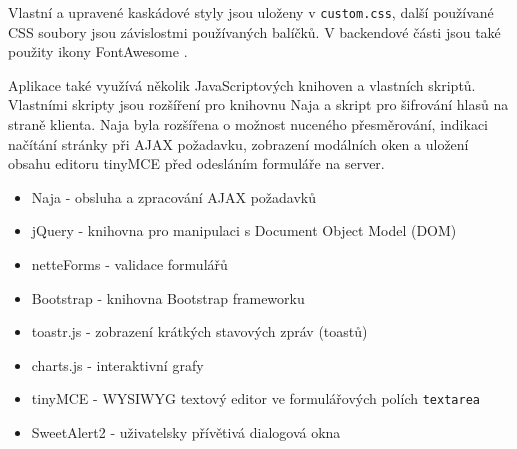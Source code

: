 Vlastní a upravené kaskádové styly jsou uloženy v \texttt{custom.css}, další používané CSS soubory jsou závislostmi používaných balíčků. V backendové části jsou také použity ikony FontAwesome \cite{FontAwesome}.


Aplikace také využívá několik JavaScriptových knihoven a vlastních skriptů. Vlastními skripty jsou rozšíření pro knihovnu Naja a skript pro šifrování hlasů na straně klienta. Naja byla rozšířena o možnost nuceného přesměrování, indikaci načítání stránky při AJAX požadavku, zobrazení modálních oken a uložení obsahu editoru tinyMCE před odesláním formuláře na server.
\begin{itemize}
	\item Naja - obsluha a zpracování AJAX požadavků
	\item jQuery - knihovna pro manipulaci s Document Object Model (DOM)
	\item netteForms - validace formulářů
	\item Bootstrap - knihovna Bootstrap frameworku
	\item toastr.js - zobrazení krátkých stavových zpráv (toastů)
	\item charts.js - interaktivní grafy
	\item tinyMCE - WYSIWYG textový editor ve formulářových polích \texttt{textarea}
	\item SweetAlert2 - uživatelsky přívětivá dialogová okna
\end{itemize}
